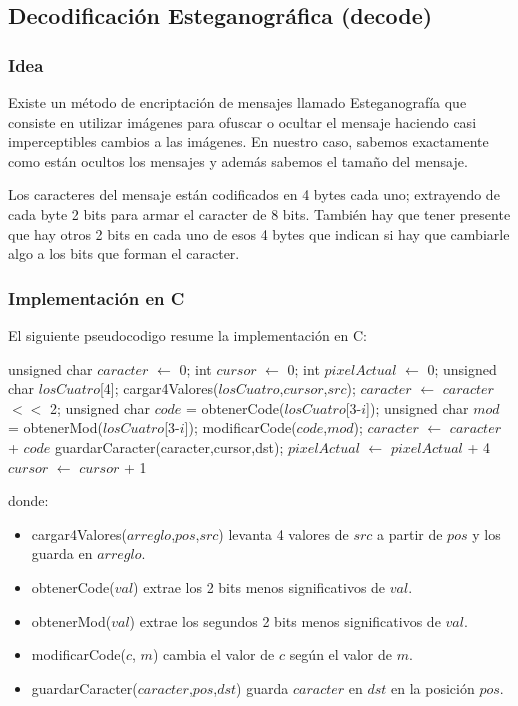 \subsection{Decodificaci\'on Esteganogr\'afica (decode)}
	\subsubsection{Idea}
	
		Existe un m\'etodo de encriptaci\'on de mensajes llamado Esteganograf\'ia que consiste en utilizar im\'agenes para ofuscar o ocultar el mensaje haciendo casi imperceptibles cambios a las im\'agenes. En nuestro caso, sabemos exactamente como est\'an ocultos los mensajes y adem\'as sabemos el tama\~no del mensaje.
		
		Los caracteres del mensaje est\'an codificados en 4 bytes cada uno; extrayendo de cada byte 2 bits para armar el caracter de 8 bits. Tambi\'en hay que tener presente que hay otros 2 bits en cada uno de esos 4 bytes que indican si hay que cambiarle algo a los bits que forman el caracter.
		 
	\subsubsection{Implementaci\'on en C}

	El siguiente pseudocodigo resume la implementaci\'on en C:
	
	\begin{algorithmic}[1]
		\State unsigned char $caracter$ $\gets$ 0;
		\State int $cursor$ $\gets$ 0;
		\State int $pixelActual$ $\gets$ 0;
			\State unsigned char $losCuatro$[4];
			\State cargar4Valores($losCuatro$,$cursor$,$src$);
				\State $caracter$ $\gets$ $caracter$ $<<$ 2;
				\State unsigned char $code$ = obtenerCode($losCuatro$[3-$i$]);
				\State unsigned char $mod$ = obtenerMod($losCuatro$[3-$i$]);
				\State modificarCode($code$,$mod$);
				\State $caracter$ $\gets$ $caracter$ + $code$
			\EndFor
			\State guardarCaracter(caracter,cursor,dst);
			\State $pixelActual$ $\gets$ $pixelActual$ + 4
			\State $cursor$ $\gets$ $cursor$ + 1
		\EndWhile	
	\end{algorithmic}
	
	donde: 
	\begin{itemize}
		\item cargar4Valores($arreglo$,$pos$,$src$) levanta 4 valores de $src$ a partir de $pos$ y los guarda en $arreglo$.
		\item obtenerCode($val$) extrae los 2 bits menos significativos de $val$.
		\item obtenerMod($val$) extrae los segundos 2 bits menos significativos de $val$.
		\item modificarCode($c$, $m$) cambia el valor de $c$ seg\'un el valor de $m$.
		\item guardarCaracter($caracter$,$pos$,$dst$) guarda $caracter$ en $dst$ en la posici\'on $pos$.
	\end{itemize}


